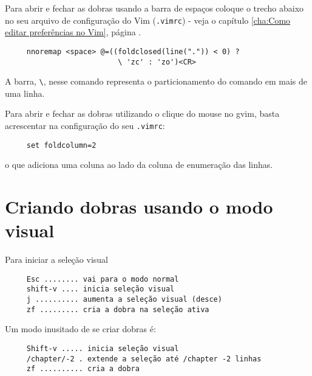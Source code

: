 Para abrir e fechar as dobras usando a barra de
espaços coloque o trecho abaixo no seu arquivo de configuração do Vim
(\verb|.vimrc|) - veja o capítulo \ref{cha:Como editar preferências no Vim},
página \pageref{cha:Como editar preferências no Vim}.
\begin{verbatim}
     nnoremap <space> @=((foldclosed(line(".")) < 0) ?
                          \ 'zc' : 'zo')<CR>
\end{verbatim}
A barra, \verb|\|, nesse comando representa o particionamento do comando em
mais de uma linha.

Para abrir e fechar as dobras utilizando o clique do mouse no gvim, basta
acrescentar na configuração do seu \verb|.vimrc|:
\begin{verbatim}
     set foldcolumn=2
\end{verbatim}
o que adiciona uma coluna ao lado da coluna de enumeração das linhas.

\section{Criando dobras usando o modo visual}
\label{Criando folders usando o modo visual}
Para iniciar a seleção visual
\begin{verbatim}
     Esc ........ vai para o modo normal
     shift-v .... inicia seleção visual
     j .......... aumenta a seleção visual (desce)
     zf ......... cria a dobra na seleção ativa
\end{verbatim}

Um modo inusitado de se criar dobras é:
\begin{verbatim}
     Shift-v ..... inicia seleção visual
     /chapter/-2 . extende a seleção até /chapter -2 linhas
     zf .......... cria a dobra
\end{verbatim}

